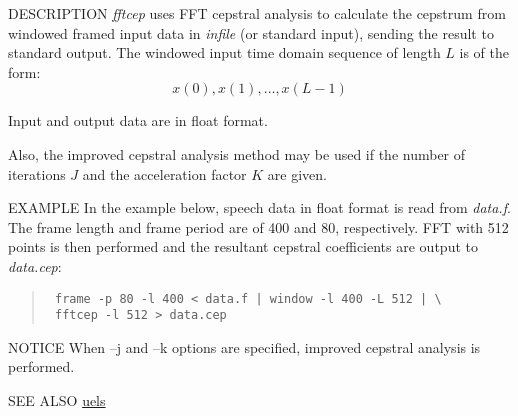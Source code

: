 \begin{synopsis}
\item[fftcep] [ --m $M$ ] [ --l $L$ ] [ --j $J$ ] [ --k $K$ ] 
	    [ --e $E$ ] [ {\em infile} ] 
\end{synopsis}

\begin{qsection}{DESCRIPTION}
{\em fftcep} uses FFT cepstral analysis to calculate the cepstrum 
from windowed framed input data in {\em infile} (or standard input), 
sending the result to standard output.
The windowed input time domain sequence of length $L$ is of the form:
\begin{displaymath}
  x(0),x(1),\dots,x(L-1)
\end{displaymath}
\par
Input and output data are in float format.
\par
Also, the improved cepstral analysis method \cite{ref:icep-IECE} may be used if the
number of iterations $J$ and the acceleration factor $K$ are given.
\end{qsection}

\begin{options}
\end{options}

\begin{qsection}{EXAMPLE}
In the example below, speech data in float format is read from {\em data.f}.  The
frame length and frame period are of 400 and 80, respectively.
FFT with 512 points is then performed and
the resultant cepstral coefficients are output to {\em data.cep}:
\begin{quote}
  \verb! frame -p 80 -l 400 < data.f | window -l 400 -L 512 | \! \\
  \verb! fftcep -l 512 > data.cep!
\end{quote}
\end{qsection}

\begin{qsection}{NOTICE}
When --j and --k options are specified, improved cepstral analysis is performed.
\end{qsection}

\begin{qsection}{SEE ALSO}
\hyperlink{uels}{uels}
\end{qsection}
